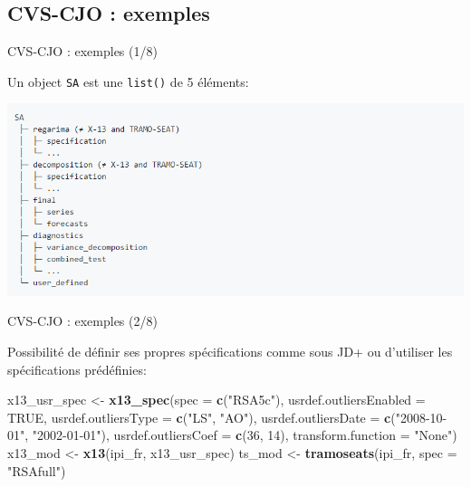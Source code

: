 \documentclass[10pt,xcolor=table,color={dvipsnames,usenames},ignorenonframetext,usepdftitle=false,french]{beamer}
\newenvironment{Shaded}{\begin{snugshade}}{\end{snugshade}}
\newcommand{\DataTypeTok}[1]{\textcolor[rgb]{0.13,0.29,0.53}{#1}}
\newcommand{\DecValTok}[1]{\textcolor[rgb]{0.00,0.00,0.81}{#1}}
\newcommand{\KeywordTok}[1]{\textcolor[rgb]{0.13,0.29,0.53}{\textbf{#1}}}
\newcommand{\NormalTok}[1]{#1}
\newcommand{\OtherTok}[1]{\textcolor[rgb]{0.56,0.35,0.01}{#1}}
\newcommand{\StringTok}[1]{\textcolor[rgb]{0.31,0.60,0.02}{#1}}
\begin{document}
\hypertarget{cvs-cjo-exemples}{%
\subsection{CVS-CJO : exemples}\label{cvs-cjo-exemples}}

\begin{frame}[fragile]{CVS-CJO : exemples (1/8)}
\protect\hypertarget{cvs-cjo-exemples-18}{}

Un object \texttt{SA} est une \texttt{list()} de 5 éléments:

\includegraphics{img/sa_obj_struct.png}

\end{frame}

\begin{frame}[fragile]{CVS-CJO : exemples (2/8)}
\protect\hypertarget{cvs-cjo-exemples-28}{}

Possibilité de définir ses propres spécifications comme sous JD+ ou
d'utiliser les spécifications prédéfinies:

\footnotesize

\begin{Shaded}
\begin{Highlighting}[]
\NormalTok{x13_usr_spec <-}\StringTok{ }\KeywordTok{x13_spec}\NormalTok{(}\DataTypeTok{spec =} \KeywordTok{c}\NormalTok{(}\StringTok{"RSA5c"}\NormalTok{),}
                             \DataTypeTok{usrdef.outliersEnabled =} \OtherTok{TRUE}\NormalTok{,}
                             \DataTypeTok{usrdef.outliersType =} \KeywordTok{c}\NormalTok{(}\StringTok{"LS"}\NormalTok{, }\StringTok{"AO"}\NormalTok{),}
                             \DataTypeTok{usrdef.outliersDate =} \KeywordTok{c}\NormalTok{(}\StringTok{"2008-10-01"}\NormalTok{,}
                                                     \StringTok{"2002-01-01"}\NormalTok{),}
                             \DataTypeTok{usrdef.outliersCoef =} \KeywordTok{c}\NormalTok{(}\DecValTok{36}\NormalTok{, }\DecValTok{14}\NormalTok{),}
                             \DataTypeTok{transform.function =} \StringTok{"None"}\NormalTok{)}
\NormalTok{x13_mod <-}\StringTok{ }\KeywordTok{x13}\NormalTok{(ipi_fr, x13_usr_spec)}
\NormalTok{ts_mod <-}\StringTok{ }\KeywordTok{tramoseats}\NormalTok{(ipi_fr, }\DataTypeTok{spec =} \StringTok{"RSAfull"}\NormalTok{)}
\end{Highlighting}
\end{Shaded}

\end{frame}
\end{document}
